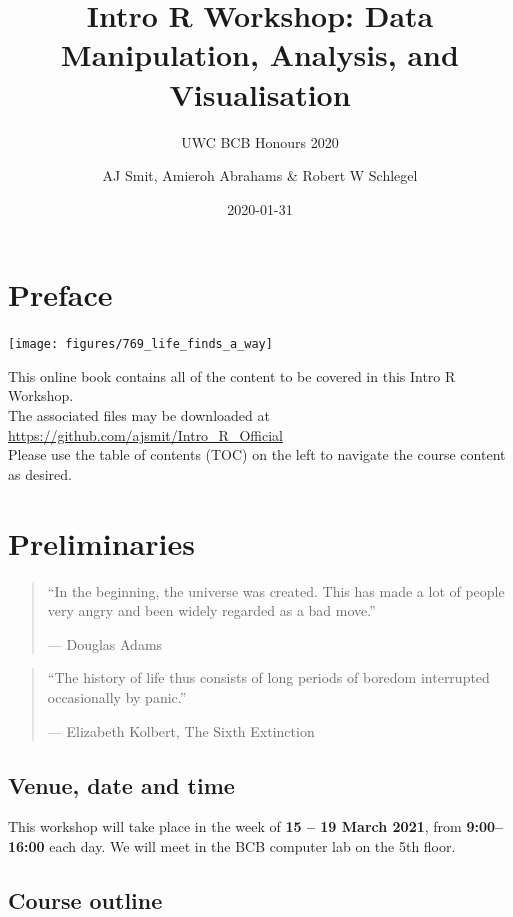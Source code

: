 \documentclass[
]{book}
\title{Intro R Workshop: Data Manipulation, Analysis, and Visualisation}
\subtitle{UWC BCB Honours 2020}
\author{AJ Smit, Amieroh Abrahams \& Robert W Schlegel}
\date{2020-01-31}
\begin{document}
\maketitle

{
\setcounter{tocdepth}{1}
\tableofcontents
}
\hypertarget{preface}{%
\chapter*{Preface}\label{preface}}

\begin{center}\texttt{[image: figures/769\_life\_finds\_a\_way]} \end{center}

This online book contains all of the content to be covered in this Intro R Workshop.\\
The associated files may be downloaded at \url{https://github.com/ajsmit/Intro_R_Official}\\
Please use the table of contents (TOC) on the left to navigate the course content as desired.

\hypertarget{prelim}{%
\chapter{Preliminaries}\label{prelim}}

\begin{quote}
``In the beginning, the universe was created. This has made a lot of people very angry and been widely regarded as a bad move.''

--- Douglas Adams
\end{quote}

\begin{quote}
``The history of life thus consists of long periods of boredom interrupted occasionally by panic.''

--- Elizabeth Kolbert, The Sixth Extinction
\end{quote}

\hypertarget{venue-date-and-time}{%
\section{Venue, date and time}\label{venue-date-and-time}}

This workshop will take place in the week of \textbf{15 -- 19 March 2021}, from \textbf{9:00--16:00} each day. We will meet in the BCB computer lab on the 5th floor.

\hypertarget{course-outline}{%
\section{Course outline}\label{course-outline}}
\end{document}

